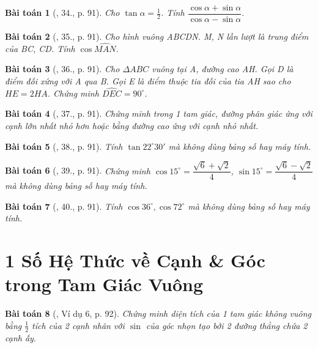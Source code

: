 \documentclass{article}
\newtheorem{baitoan}{Bài toán}
\begin{document}
\begin{baitoan}[\cite{Binh_Toan_9_tap_1}, 34., p. 91]
	Cho $\tan\alpha = \frac{1}{2}$. Tính $\dfrac{\cos\alpha + \sin\alpha}{\cos\alpha - \sin\alpha}$.
\end{baitoan}

\begin{baitoan}[\cite{Binh_Toan_9_tap_1}, 35., p. 91]
	Cho hình vuông ABCDN. M, N lần lượt là trung điểm của BC, CD. Tính $\cos\widehat{MAN}$.
\end{baitoan}

\begin{baitoan}[\cite{Binh_Toan_9_tap_1}, 36., p. 91]
	Cho $\Delta ABC$ vuông tại A, đường cao AH. Gọi D là điểm đối xứng với A qua B. Gọi E là điểm thuộc tia đối của tia AH sao cho $HE = 2HA$. Chứng minh $\widehat{DEC} = 90^\circ$.
\end{baitoan}

\begin{baitoan}[\cite{Binh_Toan_9_tap_1}, 37., p. 91]
	Chứng minh trong 1 tam giác, đường phân giác ứng với cạnh lớn nhất nhỏ hơn hoặc bằng đường cao ứng với cạnh nhỏ nhất.
\end{baitoan}

\begin{baitoan}[\cite{Binh_Toan_9_tap_1}, 38., p. 91]
	Tính $\tan22^\circ30'$ mà không dùng bảng số hay máy tính.
\end{baitoan}

\begin{baitoan}[\cite{Binh_Toan_9_tap_1}, 39., p. 91]
	Chứng minh $\cos15^\circ = \dfrac{\sqrt{6} + \sqrt{2}}{4}$, $\sin15^\circ = \dfrac{\sqrt{6} - \sqrt{2}}{4}$ mà không dùng bảng số hay máy tính.
\end{baitoan}

\begin{baitoan}[\cite{Binh_Toan_9_tap_1}, 40., p. 91]
	Tính $\cos36^\circ,\cos72^\circ$ mà không dùng bảng số hay máy tính.
\end{baitoan}


\section{1 Số Hệ Thức về Cạnh \& Góc trong Tam Giác Vuông}

\begin{baitoan}[\cite{Binh_Toan_9_tap_1}, Ví dụ 6, p. 92]
	Chứng minh diện tích của 1 tam giác không vuông bằng $\frac{1}{2}$ tích của 2 cạnh nhân với $\sin$ của góc nhọn tạo bởi 2 đường thẳng chứa 2 cạnh ấy.
\end{baitoan}
\end{document}
